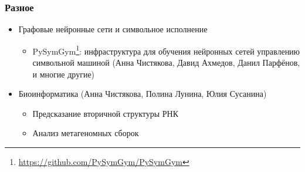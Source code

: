 \documentclass[xcolor=table,aspectratio=169]{beamer}
\begin{document}
\begin{frame}[fragile]
  \frametitle{Разное}
  \begin{itemize}
    \item Графовые нейронные сети и символьное исполнение
    \begin{itemize}
      \item PySymGym\footnote{\url{https://github.com/PySymGym/PySymGym}}: инфраструктура для обучения нейронных сетей управлению символьной машиной (Анна Чистякова, Давид Ахмедов, Данил Парфёнов, и многие другие)
    \end{itemize}
    \item Биоинформатика (Анна Чистякова, Полина Лунина, Юлия Сусанина)
    \begin{itemize}
      \item Предсказание вторичной структуры РНК
      \item Анализ метагеномных сборок
    \end{itemize}
    
  \end{itemize}
\end{frame}
\end{document}
